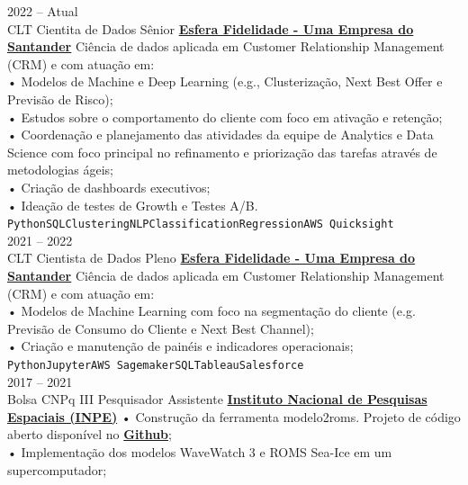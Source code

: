 \documentclass[9pt]{developercv} %
\begin{document}
\begin{entrylist}
	\entry
		{2022 -- Atual\\\footnotesize{CLT}}
		{Cientita de Dados Sênior}
		{\href{https://www.esfera.com.vc}{\textcolor{bleu_cite}{\textbf{Esfera Fidelidade - Uma Empresa do Santander}}}}
		{Ciência de dados aplicada em Customer Relationship Management (CRM) e com atuação em:\\
		• Modelos de Machine e Deep Learning (e.g., Clusterização, Next Best Offer e Previsão de Risco);\\
		• Estudos sobre o comportamento do cliente com foco em ativação e retenção;\\
		• Coordenação e planejamento das atividades da equipe de Analytics e Data Science com foco principal no refinamento e priorização das tarefas através de metodologias ágeis;\\
		• Criação de dashboards executivos;\\
		• Ideação de testes de Growth e Testes A/B.\\
        \texttt{Python}\slashsep\texttt{SQL}\slashsep\texttt{Clustering}\slashsep\texttt{NLP}\slashsep\texttt{Classification}\slashsep\texttt{Regression}\slashsep\texttt{AWS Quicksight}}
		\\\entry
		{2021 --  2022\\\footnotesize{CLT}}
		{Cientista de Dados Pleno}
		{\href{https://www.esfera.com.vc}{\textcolor{bleu_cite}{\textbf{Esfera Fidelidade - Uma Empresa do Santander}}}}
		{Ciência de dados aplicada em Customer Relationship Management (CRM) e com atuação em:\\
		• Modelos de Machine Learning com foco na segmentação do cliente (e.g. Previsão de Consumo do Cliente e Next Best Channel);\\
		• Criação e manutenção de painéis e indicadores operacionais;\\
		\texttt{Python}\slashsep\texttt{Jupyter}\slashsep\texttt{AWS Sagemaker}\slashsep\texttt{SQL}\slashsep\texttt{Tableau}\slashsep\texttt{Salesforce}}
		\\\entry
		{2017 -- 2021\\\footnotesize{Bolsa CNPq III}}
		{Pesquisador Assistente}
		{\href{https://www.gov.br/inpe/pt-br}{\textcolor{bleu_cite}{\textbf{Instituto Nacional de Pesquisas Espaciais (INPE)}}}}
		{• Construção da ferramenta modelo2roms. Projeto de código aberto disponível no \href{https://github.com/uesleisutil/model2roms}{\textcolor{bleu_cite}{\textbf{Github}}}; \\	
		• Implementação dos modelos WaveWatch 3 e ROMS Sea-Ice em um supercomputador;\\
}
\end{entrylist}
\end{document}
